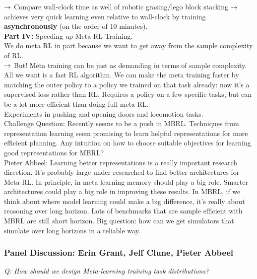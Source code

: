 $\rightarrow$ Compare wall-clock time as well of robotic grasing/lego block stacking $\rightarrow$ achieves very quick learning even relative to wall-clock by training {\bf asynchronously} (on the order of 10 minutes). \\

{\bf Part IV:} Speeding up Meta RL Training. \\

We do meta RL in part because we want to get away from the sample complexity of RL. \\

$\rightarrow$ But! Meta training can be just as demanding in terms of sample complexity. \\

All we want is a fast RL algorithm. We can make the meta training faster by matching the outer policy to a policy we trained on that task already: now it's a supervised loss rather than RL. Requires a policy on a few specific tasks, but can be a lot more efficient than doing full meta RL. \\

Experiments in pushing and opening doors and locomotion tasks. \\

Challenge Question: Recently seems to be a push in MBRL. Techniques from representation learning seem promising to learn helpful representations for more efficient planning. Any intuition on how to choose suitable objectives for learning good representations for MBRL? \\

Pieter Abbeel: Learning better representations is a really important research direction. It's probably large under researched to find better architectures for Meta-RL. In principle, in meta learning memory should play a big role. Smarter architectures could play a big role in improving these results. In MBRL, if we think about where model learning could make a big difference, it's really about reasoning over long horizon. Lots of benchmarks that are sample efficient with MBRL are still short horizon. Big question: how can we get simulators that simulate over long horizons in a reliable way.


\subsubsection{Panel Discussion: Erin Grant, Jeff Clune, Pieter Abbeel}

{\it Q: How should we design Meta-learning training task distributions?} \\

